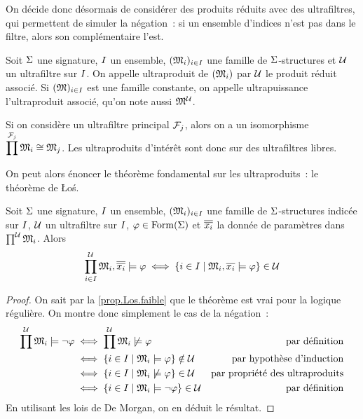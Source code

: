 On décide donc désormais de considérer des produits réduits avec des
ultrafiltres, qui permettent de simuler la négation~: si un ensemble d'indices
n'est pas dans le filtre, alors son complémentaire l'est.

\begin{definition}
  Soit $\Sigma$ une signature, $I$ un ensemble, $(\mathfrak{M}_i)_{i \in I}$
  une famille de $\Sigma$-structures et $\mathcal{U}$ un ultrafiltre sur $I$.
  On appelle ultraproduit de $(\mathfrak{M}_i)$ par $\mathcal{U}$ le produit réduit
  associé. Si $(\mathfrak{M})_{i \in I}$ est une famille constante, on appelle
  ultrapuissance l'ultraproduit associé, qu'on note aussi $\mathfrak{M}^{\mathcal{U}}$.
\end{definition}

\begin{remark}
  Si on considère un ultrafiltre principal $\mathcal{F}_{j}$, alors on a un
  isomorphisme $\displaystyle\prod^{\mathcal{F}_{j}} \mathfrak{M}_i \cong \mathfrak{M}_j$. Les
  ultraproduits d'intérêt sont donc sur des ultrafiltres libres.
\end{remark}

\noindent
On peut alors énoncer le théorème fondamental sur les ultraproduits~: le
théorème de Łoś.

\begin{theorem}\label{thm.Los}
  Soit $\Sigma$ une signature, $I$ un ensemble, $(\mathfrak{M}_i)_{i \in I}$
  une famille de $\Sigma$-structures indicée sur $I$, $\mathcal{U}$ un
  ultrafiltre sur $I$, $\varphi\in\operatorname{Form}(\Sigma)$ et
  $\overline{\overline{x_i}}$ la donnée de paramètres dans
  $\prod^{\mathcal{U}}\mathfrak{M}_i$. Alors
  \[\prod_{i \in I}^{\mathcal{U}} \mathfrak{M}_i,\overline{\overline{x_i}}\models
  \varphi \iff
  \left\{ i \in I \;\middle\vert\; \mathfrak{M}_i,\overline{x_i} \models \varphi \right\}
  \in \mathcal{U}\]
\end{theorem}

\begin{proof}
  On sait par la \cref{prop.Los.faible} que le théorème est vrai pour la
  logique régulière. On montre donc simplement le cas de la négation~:
  \begin{align*}
    \prod^{\mathcal{U}}\mathfrak{M}_i\models\lnot\varphi &\iff
    \prod^{\mathcal{U}}\mathfrak{M}_i\not\models\varphi &\text{par définition}\\
    &\iff \left\{ i \in I \;\middle\vert\; \mathfrak{M}_i\models\varphi \right\} \notin \mathcal{U}
    &\text{par hypothèse d'induction}\\
    &\iff \left\{ i \in I \;\middle\vert\; \mathfrak{M}_i\not\models\varphi \right\} \in \mathcal{U}
    &\text{par propriété des ultraproduits}\\
    &\iff \left\{ i \in I \;\middle\vert\; \mathfrak{M}_i\models\lnot\varphi \right\}\in \mathcal{U}
    &\text{par définition}
  \end{align*}
  En utilisant les lois de De Morgan, on en déduit le résultat.
\end{proof}

